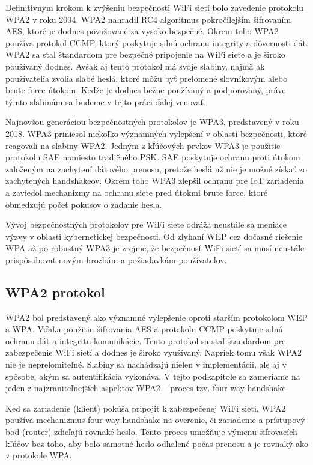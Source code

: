 \documentclass[12pt, twoside]{book}
\begin{document}
Definitívnym krokom k zvýšeniu bezpečnosti WiFi sietí bolo zavedenie protokolu WPA2 v roku 2004. WPA2 nahradil RC4 algoritmus pokročilejším šifrovaním AES, ktoré je dodnes považované za vysoko bezpečné. Okrem toho WPA2 používa protokol CCMP, ktorý poskytuje silnú ochranu integrity a dôvernosti dát. WPA2 sa stal štandardom pre bezpečné pripojenie na WiFi siete a je široko používaný dodnes. \cite{wpa3_adoption} Avšak aj tento protokol má svoje slabiny, najmä ak používatelia zvolia slabé heslá, ktoré môžu byť prelomené slovníkovým alebo brute force útokom. Keďže je dodnes bežne používaný a podporovaný, práve týmto slabinám sa budeme v tejto práci ďalej venovať.

Najnovšou generáciou bezpečnostných protokolov je WPA3, predstavený v roku 2018. WPA3 priniesol niekoľko významných vylepšení v oblasti bezpečnosti, ktoré reagovali na slabiny WPA2. Jedným z kľúčových prvkov WPA3 je použitie protokolu SAE namiesto tradičného PSK. SAE poskytuje ochranu proti útokom založeným na zachytení dátového prenosu, pretože heslá už nie je možné získať zo zachytených handshakeov. Okrem toho WPA3 zlepšil ochranu pre IoT zariadenia a zaviedol mechanizmy na ochranu siete pred útokmi brute force, ktoré obmedzujú počet pokusov o zadanie hesla.\cite{vseob_2}

Vývoj bezpečnostných protokolov pre WiFi siete odráža neustále sa meniace výzvy v oblasti kybernetickej bezpečnosti. Od zlyhaní WEP cez dočasné riešenie WPA až po robustný WPA3 je zrejmé, že bezpečnosť WiFi sietí sa musí neustále prispôsobovať novým hrozbám a požiadavkám používateľov.

\subsection{WPA2 protokol}
WPA2 bol predstavený ako významné vylepšenie oproti starším protokolom WEP a WPA. Vďaka použitiu šifrovania AES a protokolu CCMP poskytuje silnú ochranu dát a integritu komunikácie. Tento protokol sa stal štandardom pre zabezpečenie WiFi sietí a dodnes je široko využívaný.\cite{wpa3_adoption} Napriek tomu však WPA2 nie je neprelomiteľné. Slabiny sa nachádzajú nielen v implementácii, ale aj v spôsobe, akým sa autentifikácia vykonáva. V tejto podkapitole sa zameriame na jeden z najzraniteľnejších aspektov WPA2 – proces tzv. four-way handshake.

Keď sa zariadenie (klient) pokúša pripojiť k zabezpečenej WiFi sieti, WPA2 používa mechanizmus four-way handshake na overenie, či zariadenie a prístupový bod (router) zdieľajú rovnaké heslo. Tento proces umožňuje výmenu šifrovacích kľúčov bez toho, aby bolo samotné heslo odhalené počas prenosu a je rovnaký ako v protokole WPA.\cite{vseob_1, slabiny_po_2}
\end{document}
